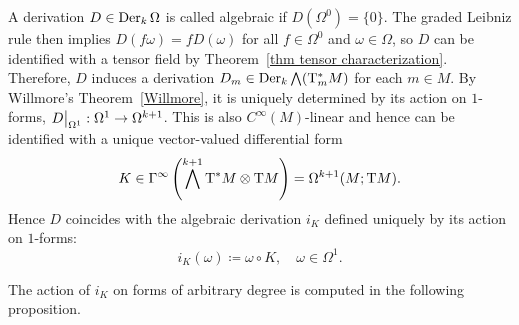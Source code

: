 \begin{defn}
    A derivation $D\in\operatorname{Der}_k\Omega$ is called algebraic if $D(\Omega^0)=\{0\}$. The graded Leibniz rule then implies $D(f\omega)=fD(\omega)$ for all $f\in \Omega^0$ and $\omega\in \Omega$, so $D$ can be identified with a tensor field by Theorem~\ref{thm tensor characterization}. Therefore, $D$ induces a derivation $D_m\in \operatorname{Der}_k \bigwedge (\mathrm{T}^\ast_m M)$ for each $m\in M$. By Willmore's Theorem~\ref{Willmore}, it is uniquely determined by its action on $1$-forms, $\restr{D}{\Omega^1}:\Omega^1\to \Omega^{k+1}$. This is also $C^\infty(M)$-linear and hence can be identified with a unique vector-valued differential form 
    \[K\in \Gamma^\infty\left(\bigwedge^{k+1}\mathrm{T}^\ast M\otimes \mathrm{T} M\right)=\Omega^{k+1}(M;\mathrm{T} M).\]
    Hence $D$ coincides with the algebraic derivation $i_K$ defined uniquely by its action on $1$-forms:
    \[i_K(\omega)\coloneqq \omega\circ K,\quad \omega\in\Omega^1.\]
\end{defn}

The action of $i_K$ on forms of arbitrary degree is computed in the following proposition.

